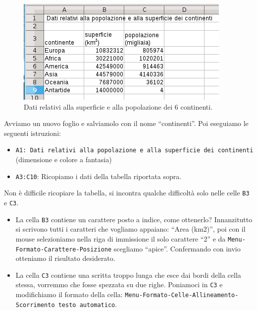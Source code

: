 \begin{inaccessibleblock}
 \begin{figure}[htbp]
\centering
\begin{inaccessibleblock}
 \includegraphics[scale=0.8]{img/01_calc.png}
\end{inaccessibleblock}
\caption{Dati relativi alla superficie e alla popolazione dei 6 continenti.}
\end{figure}
\end{inaccessibleblock}

Avviamo un nuovo foglio e salviamolo con il nome ``continenti''.
Poi eseguiamo le seguenti istruzioni:

\begin{itemize}
\item {}
\texttt{A1: Dati relativi alla popolazione e alla superficie dei continenti}
(dimensione e colore a fantasia)

\item {}
\texttt{A3:C10}:
Ricopiamo i dati della tabella riportata sopra.

\end{itemize}

Non è difficile ricopiare la tabella, si incontra qualche
difficoltà solo nelle celle \texttt{B3} e \texttt{C3}.

\begin{itemize}
\item {} 
La cella \texttt{B3} contiene un carattere posto a indice, come ottenerlo?
Innanzitutto si scrivono tutti i caratteri che vogliamo appaiano:
``Area (km2)'', poi con il mouse selezioniamo nella riga di immissione
il solo carattere ``2'' e da \texttt{Menu-Formato-Carattere-Posizione} scegliamo
``apice''. Confermando con invio otteniamo il risultato desiderato.

\item {} 
La cella \texttt{C3} contiene una scritta troppo lunga che esce dai bordi della
cella stessa, vorremmo che fosse spezzata su due righe. Poniamoci in \texttt{C3}
e modifichiamo il formato della cella:
\texttt{Menu-Formato-Celle-Allineamento-Scorrimento testo automatico}.

\end{itemize}

